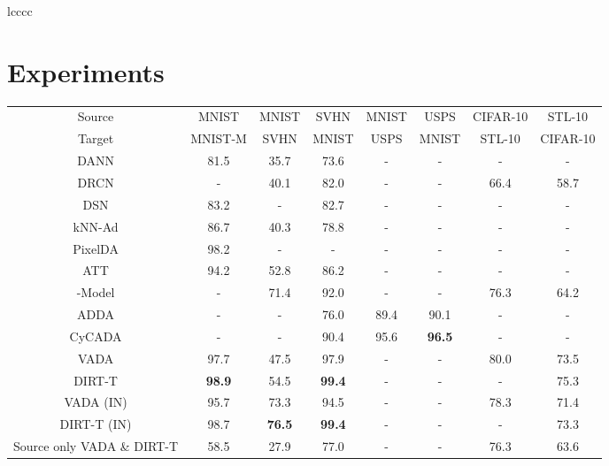 \documentclass{article} \usepackage{iclr2020_conference,times}
\begin{document}
\begin{wraptable}{r}{0.45\textwidth}
\begin{tabular}{lcccc}
 \section{Experiments}
\label{results}
\begin{table*}[t!]
\begin{center}
{
\vspace{-3ex}
\small
\setlength\tabcolsep{3pt}
\begin{tabular}{cccccccc}
\hline
Source & MNIST    	& MNIST   & SVHN & MNIST & USPS 	& CIFAR-10 & STL-10\\
Target & MNIST-M   & SVHN   & MNIST & USPS & MNIST	& STL-10 & CIFAR-10\\
\hline
DANN \citep{ganin2016domain}
	   				& 81.5 	   & 35.7		   & 73.6 	&	-			&	-			&	-			&	-	\\
DRCN \citep{ghifary2016deep}
					& -	     	   & 40.1		   & 82.0 	&	-			&	-			&	66.4	&	58.7\\
DSN  \citep{bousmalis2016domain}
					& 83.2 	   & -		   			& 82.7 	&	-			&	-			&	-			&	-	\\
kNN-Ad \citep{sener2016learning}
					& 86.7 	   & 40.3		   & 78.8 	&	-			&	-			&	-			&	-	\\
PixelDA \citep{bousmalis2017unsupervised}
					& 98.2 	   & -		   			& - 		&	-			&	-			&	-			&	-	\\
ATT \citep{saito2017asymmetric}
					& 94.2 	   & 52.8		   & 86.2 	&	-			&	-			&	-			&	-	\\
-Model \citep{french2017self}
					& -		 	   & 71.4		   & 92.0 	&	-			&	-			&	76.3	&	64.2\\
ADDA \citep{tzeng2017adversarial}
					& -		 	   & -		   			& 76.0 	&	89.4	& 90.1		&	-			&	-	\\
CyCADA \citep{hoffman2017cycada}
					& -		 	   & -		   			& 90.4 	&	95.6	& \textbf{96.5}		&	-	&	-	\\
VADA \citep{shu2018dirt}
					& 97.7 	   & 47.5		   & 97.9 	& -				&	-			&	80.0	& 73.5\\
DIRT-T \citep{shu2018dirt}
					& \textbf{98.9} 	   & 54.5   	&\textbf{99.4}	&	-	&	-	&	-	& 75.3\\
VADA (IN) \citep{shu2018dirt}
					& 95.7 	   & 73.3		   & 94.5 		& -				&	-			&	78.3	& 71.4\\
DIRT-T (IN) \citep{shu2018dirt}
					& 98.7 	   & \textbf{76.5}	 & \textbf{99.4} &	-	&	-	&	-	& 73.3\\
\hline
Source only VADA \& DIRT-T
					& 58.5 	& 27.9			& 77.0		& -				& - 			& 76.3		& 63.6\\

\end{tabular}}
\end{center}
\end{table*}
\end{tabular}
\end{wraptable}
\end{document}
